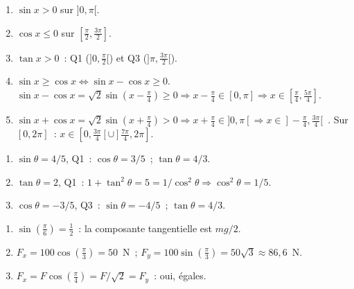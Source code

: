 
\begin{enumerate}
  \item $\sin x>0$ sur $]0,\pi[$.
  \item $\cos x\leq0$ sur $[\frac{\pi}{2},\frac{3\pi}{2}]$.
  \item $\tan x>0$~: Q1 ($]0,\frac{\pi}{2}[$) et Q3 ($]\pi,\frac{3\pi}{2}[$).
  \item $\sin x\geq\cos x\Leftrightarrow\sin x-\cos x\geq0$.
        $\sin x-\cos x=\sqrt{2}\sin(x-\frac{\pi}{4})\geq0\Rightarrow x-\frac{\pi}{4}\in[0,\pi]\Rightarrow x\in[\frac{\pi}{4},\frac{5\pi}{4}]$.
  \item $\sin x+\cos x=\sqrt{2}\sin(x+\frac{\pi}{4})>0\Rightarrow x+\frac{\pi}{4}\in]0,\pi[\Rightarrow x\in]-\frac{\pi}{4},\frac{3\pi}{4}[$~.
        Sur $[0,2\pi]$~: $x\in[0,\frac{3\pi}{4}[\cup]\frac{7\pi}{4},2\pi]$.
\end{enumerate}


\begin{enumerate}
  \item $\sin\theta=4/5$, Q1~: $\cos\theta=3/5$~; $\tan\theta=4/3$.
  \item $\tan\theta=2$, Q1~: $1+\tan^2\theta=5=1/\cos^2\theta\Rightarrow\cos^2\theta=1/5$.
  \item $\cos\theta=-3/5$, Q3~: $\sin\theta=-4/5$~; $\tan\theta=4/3$.
\end{enumerate}


\begin{enumerate}
  \item $\sin(\frac{\pi}{6})=\frac{1}{2}$~: la composante tangentielle est $mg/2$.
  \item $F_x=100\cos(\frac{\pi}{3})=50$~N~; $F_y=100\sin(\frac{\pi}{3})=50\sqrt{3}\approx86{,}6$~N.
  \item $F_x=F\cos(\frac{\pi}{4})=F/\sqrt{2}=F_y$~: oui, \'egales.\checkmark
\end{enumerate}



